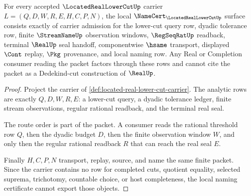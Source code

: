 \begin{theorem}
\label{thm:located-real-lower-cut-namecert-obligations}
For every accepted $\LocatedRealLowerCutUp$ carrier $L=(Q,D,W,R,E,H,C,P,N)$, the local $\NameCert_{\LocatedRealLowerCutUp}$ surface consists exactly of carrier admission for the lower-cut query row, dyadic tolerance row, finite $\StreamNameUp$ observation windows, $\RegSeqRatUp$ readback, terminal $\RealUp$ seal handoff, componentwise $\hsame$ transport, displayed $\Cont$ replay, $\Pkg$ provenance, and local naming row. Any Real or Completion consumer reading the packet factors through these rows and cannot cite the packet as a Dedekind-cut construction of $\RealUp$.
\end{theorem}
\begin{proof}
Project the carrier of \autoref{def:located-real-lower-cut-carrier}. The analytic rows are exactly $Q,D,W,R,E$: a lower-cut query, a dyadic tolerance ledger, finite stream observations, regular rational readback, and the terminal real seal.

The route order is part of the packet. A consumer reads the rational threshold row $Q$, then the dyadic budget $D$, then the finite observation window $W$, and only then the regular rational readback $R$ that can reach the real seal $E$.

Finally $H,C,P,N$ transport, replay, source, and name the same finite packet. Since the carrier contains no row for completed cuts, quotient equality, selected suprema, trichotomy, countable choice, or host completeness, the local naming certificate cannot export those objects.
\end{proof}

